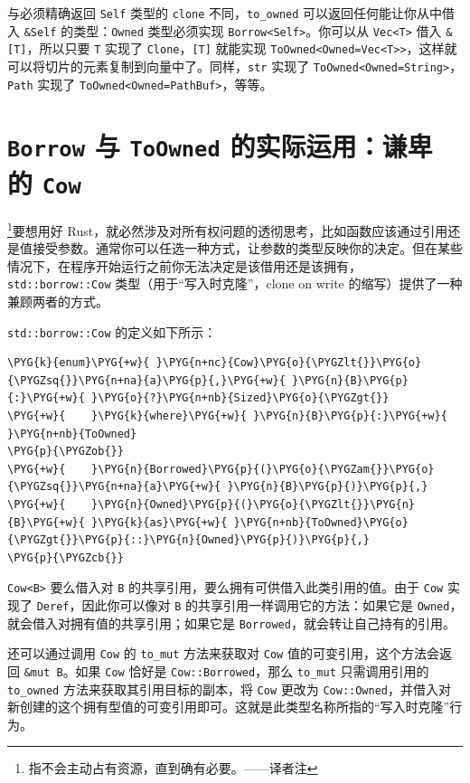 与必须精确返回 \texttt{Self} 类型的 \texttt{clone} 不同，\texttt{to\_owned} 可以返回任何能让你从中借入 \texttt{\&Self} 的类型：\texttt{Owned} 类型必须实现 \texttt{Borrow<Self>}。你可以从 \texttt{Vec<T>} 借入 \texttt{\&[T]}，所以只要 \texttt{T} 实现了 \texttt{Clone}，\texttt{[T]} 就能实现 \texttt{ToOwned<Owned=Vec<T>>}，这样就可以将切片的元素复制到向量中了。同样，\texttt{str} 实现了 \texttt{ToOwned<Owned=String>}，\texttt{Path} 实现了 \texttt{ToOwned<Owned=PathBuf>}，等等。

\section{\texttt{Borrow} 与 \texttt{ToOwned} 的实际运用：谦卑  的 \texttt{Cow}}

\footnote{指不会主动占有资源，直到确有必要。——译者注}要想用好 Rust，就必然涉及对所有权问题的透彻思考，比如函数应该通过引用还是值接受参数。通常你可以任选一种方式，让参数的类型反映你的决定。但在某些情况下，在程序开始运行之前你无法决定是该借用还是该拥有，\texttt{std::borrow::Cow} 类型（用于“写入时克隆”，clone on write 的缩写）提供了一种兼顾两者的方式。

\texttt{std::borrow::Cow} 的定义如下所示：

\begin{Verbatim}[commandchars=\\\{\},breaklines=true,breakanywhere=true,fontsize=\codefont,xleftmargin=17bp]
\PYG{k}{enum}\PYG{+w}{ }\PYG{n+nc}{Cow}\PYG{o}{\PYGZlt{}}\PYG{o}{\PYGZsq{}}\PYG{n+na}{a}\PYG{p}{,}\PYG{+w}{ }\PYG{n}{B}\PYG{p}{:}\PYG{+w}{ }\PYG{o}{?}\PYG{n+nb}{Sized}\PYG{o}{\PYGZgt{}}
\PYG{+w}{    }\PYG{k}{where}\PYG{+w}{ }\PYG{n}{B}\PYG{p}{:}\PYG{+w}{ }\PYG{n+nb}{ToOwned}
\PYG{p}{\PYGZob{}}
\PYG{+w}{    }\PYG{n}{Borrowed}\PYG{p}{(}\PYG{o}{\PYGZam{}}\PYG{o}{\PYGZsq{}}\PYG{n+na}{a}\PYG{+w}{ }\PYG{n}{B}\PYG{p}{)}\PYG{p}{,}
\PYG{+w}{    }\PYG{n}{Owned}\PYG{p}{(}\PYG{o}{\PYGZlt{}}\PYG{n}{B}\PYG{+w}{ }\PYG{k}{as}\PYG{+w}{ }\PYG{n+nb}{ToOwned}\PYG{o}{\PYGZgt{}}\PYG{p}{::}\PYG{n}{Owned}\PYG{p}{)}\PYG{p}{,}
\PYG{p}{\PYGZcb{}}
\end{Verbatim}

\texttt{Cow<B>} 要么借入对 \texttt{B} 的共享引用，要么拥有可供借入此类引用的值。由于 \texttt{Cow} 实现了 \texttt{Deref}，因此你可以像对 \texttt{B} 的共享引用一样调用它的方法：如果它是 \texttt{Owned}，就会借入对拥有值的共享引用；如果它是 \texttt{Borrowed}，就会转让自己持有的引用。

还可以通过调用 \texttt{Cow} 的 \texttt{to\_mut} 方法来获取对 \texttt{Cow} 值的可变引用，这个方法会返回 \texttt{\&mut B}。如果 \texttt{Cow} 恰好是 \texttt{Cow::Borrowed}，那么 \texttt{to\_mut} 只需调用引用的 \texttt{to\_owned} 方法来获取其引用目标的副本，将 \texttt{Cow} 更改为 \texttt{Cow::Owned}，并借入对新创建的这个拥有型值的可变引用即可。这就是此类型名称所指的“写入时克隆”行为。

